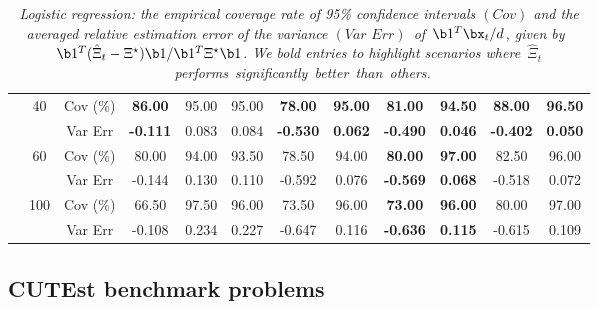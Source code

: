 \begin{table}[!t]
{\begin{tabular}{|c|c|c|c|cccccccc|}
&  \multirow{2}{*}{40} &  Cov (\%) &  \textbf{86.00} &  95.00 &  \multicolumn{1}{c|}{95.00} &  \textbf{78.00} &  \multicolumn{1}{c|}{\textbf{95.00}} &  \textbf{81.00} &  \multicolumn{1}{c|}{\textbf{94.50}} &  \textbf{88.00} &  \textbf{96.50} \\
&   &  Var Err &  \textbf{-0.111} &  0.083 &  \multicolumn{1}{c|}{0.084} &  \textbf{-0.530} &  \multicolumn{1}{c|}{\textbf{0.062}} &  \textbf{-0.490} &  \multicolumn{1}{c|}{\textbf{0.046}} &  \textbf{-0.402} &  \textbf{0.050} \\ \cline{2-12} 
&  \multirow{2}{*}{60} &  Cov (\%) &  80.00 &  94.00 &  \multicolumn{1}{c|}{93.50} &  78.50 &  \multicolumn{1}{c|}{94.00} &  \textbf{80.00} &  \multicolumn{1}{c|}{\textbf{97.00}} &  82.50 &  96.00 \\
&   &  Var Err &  -0.144 &  0.130 &  \multicolumn{1}{c|}{0.110} &  -0.592 &  \multicolumn{1}{c|}{0.076} &  \textbf{-0.569} &  \multicolumn{1}{c|}{\textbf{0.068}} &  -0.518 &  0.072 \\ \cline{2-12} 
&  \multirow{2}{*}{100} &  Cov (\%) &  66.50 &  97.50 &  \multicolumn{1}{c|}{96.00} &  73.50 &  \multicolumn{1}{c|}{96.00} &  \textbf{73.00} &  \multicolumn{1}{c|}{\textbf{96.00}} &  80.00 &  97.00 \\
&   &  Var Err &  -0.108 &  0.234 &  \multicolumn{1}{c|}{0.227} &  -0.647 &  \multicolumn{1}{c|}{0.116} &  \textbf{-0.636} &  \multicolumn{1}{c|}{\textbf{0.115}} &  -0.615 &  0.109 \\ \hline
\end{tabular}}
\caption{\textit{Logistic regression: the empirical coverage rate of 95\% confidence intervals $(\textit{Cov})$ and the averaged relative estimation error of the variance $(\textit{Var Err})$~of~$\b1^T\bx_t/d$, given by~\mbox{$\b1^T(\hat{\Xi}_t-\Xi^\star)\b1/\b1^T\Xi^\star\b1$}.
We bold entries to highlight scenarios where~$\hat{\Xi}_t$~\mbox{performs}~\mbox{significantly}~\mbox{better}~than~others.}}
\label{table:2}
\end{table}




\subsection{CUTEst benchmark problems}\label{sec5:subsec2}

